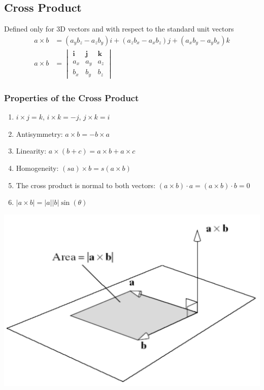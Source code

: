 \documentclass{article}
\begin{document}
\subsection*{Cross Product}
Defined only for 3D vectors and with respect to the standard unit vectors
\begin{align*}
    a \times b &= (a_y b_z - a_z b_y)i + (a_z b_x - a_x b_z)j + (a_x b_y - a_y b_x)k\\
    a \times b &= \begin{vmatrix} \textbf{i} & \textbf{j} & \textbf{k} \\ a_x & a_y & a_z \\ b_x & b_y & b_z \end{vmatrix}
\end{align*}
\subsubsection*{Properties of the Cross Product}
\begin{enumerate}
    \item $i \times j = k$, $i \times k = -j$, $j \times k = i$
    \item Antisymmetry: $a \times b = -b \times a$
    \item Linearity: $a \times (b + c) = a \times b + a \times c$
    \item Homogeneity: $(sa) \times b = s(a \times b)$
    \item The cross product is normal to both vectors: $(a \times b) \cdot a = (a \times b) \cdot b = 0$
    \item $\vert a \times b \vert = \vert a \vert \vert b \vert \sin(\theta)$
\end{enumerate}
\begin{center}
    \includegraphics*[scale=0.5]{W2_2.png}
\end{center}
\end{document}
